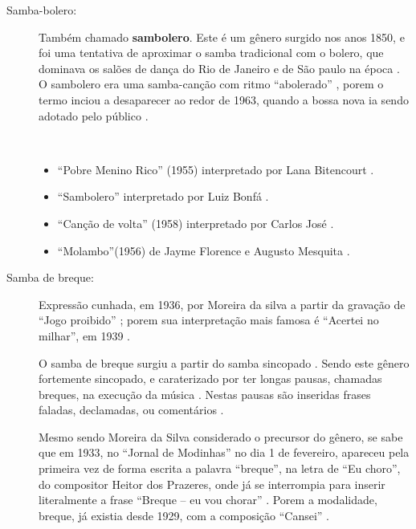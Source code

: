 \begin{description}

\item[Samba-bolero:] 
Também chamado \textbf{sambolero}.
Este é um gênero surgido nos anos 1850, e foi uma tentativa de aproximar o samba tradicional com o bolero,
que dominava os salões de dança do Rio de Janeiro e de São paulo na época \cite[pp. 291]{dourado2004dicionario}.
O sambolero era uma samba-canção com ritmo ``abolerado'' \cite[pp. 685]{marcondes1977enciclopediav2},
porem o termo inciou a desaparecer ao redor de 1963, 
quando a bossa nova ia sendo adotado pelo público \cite[pp. 84]{biblioteca2006cultura}.

\begin{example} ~

\begin{itemize}
\item ``Pobre Menino Rico'' (1955) interpretado  por Lana Bitencourt \cite[pp. 5]{pobremeninorico}.
\item ``Sambolero'' interpretado por Luiz Bonfá \cite[pp. 49]{sambolero}.
\item ``Canção de volta'' (1958) interpretado por Carlos José \cite[pp. 36]{carlosjose}.
\item ``Molambo''(1956) de Jayme Florence e Augusto Mesquita \cite[pp. 481, 516]{faour2001bastidores}.
\end{itemize}
\end{example}


\item[Samba de breque:] 

Expressão cunhada, em 1936, por Moreira da silva a partir da gravação de ``Jogo proibido'' \cite[pp. 291]{dourado2004dicionario};
porem sua interpretação mais famosa é ``Acertei no milhar'', em 1939 \cite[pp. 129]{perna2002samba}.

O samba de breque surgiu a partir do samba sincopado \cite[pp. 129]{perna2002samba}.
Sendo este gênero fortemente sincopado, 
e caraterizado por ter longas pausas, chamadas breques, na execução da música \cite[pp. 291]{dourado2004dicionario}.
Nestas pausas são inseridas frases faladas, declamadas, ou comentários \cite[pp. 129]{perna2002samba} \cite[pp. 291]{dourado2004dicionario}. 


Mesmo sendo Moreira da Silva considerado o precursor do gênero, 
se sabe que em 1933, no ``Jornal de Modinhas'' no dia 1 de fevereiro, 
apareceu pela primeira vez de forma escrita a palavra ``breque'', na letra de ``Eu choro'', 
do compositor Heitor dos Prazeres, onde já se interrompia para inserir literalmente 
a frase ``Breque -- eu vou chorar'' \cite[pp. 291]{dourado2004dicionario} \cite{rizzi2016musica}.
Porem a modalidade, breque, já existia desde 1929, com a composição ``Cansei'' \cite{rizzi2016musica}.


\end{description}
